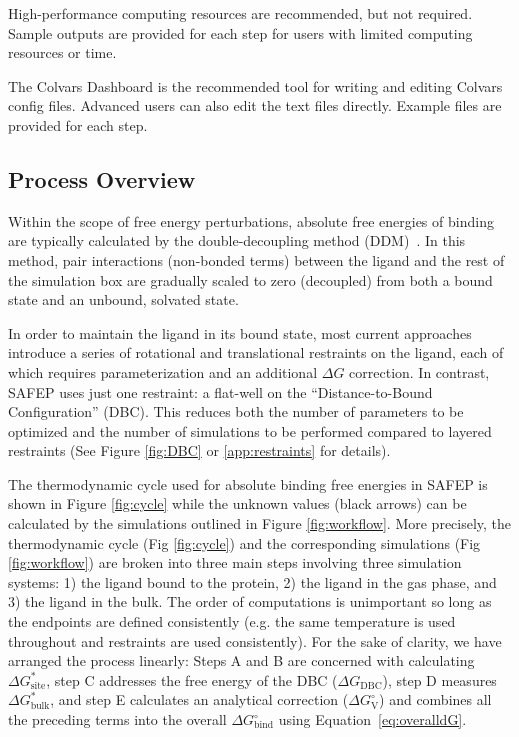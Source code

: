 \documentclass[9pt,tutorial,pubversion]{Styling/livecoms}
\begin{document}
High-performance computing resources are recommended, but not required. Sample outputs are provided for each step for users with limited computing resources or time.

The Colvars Dashboard is the recommended tool for writing and editing Colvars config files. Advanced users can also edit the text files directly. Example files are provided for each step.

\subsection{Process Overview} \label{sec:processOverview}

Within the scope of free energy perturbations, absolute free energies of binding are typically calculated by the double-decoupling method (DDM)~\cite{Gilson1997, Hamelberg2004, Woo2005}. 
In this method, pair interactions (non-bonded terms) between the ligand and the rest of the simulation box are gradually scaled to zero (decoupled) from both a bound state and an unbound, solvated state.

In order to maintain the ligand in its bound state, most current approaches introduce a series of rotational and translational restraints on the ligand, each of which requires parameterization and an additional $\Delta G$ correction.
In contrast, SAFEP uses just one restraint: a flat-well on the ``Distance-to-Bound Configuration'' (DBC). This reduces both the number of parameters to be optimized and the number of simulations to be performed compared to layered restraints (See Figure \ref{fig:DBC} or \ref{app:restraints} for details).

The thermodynamic cycle used for absolute binding free energies in SAFEP is shown in Figure \ref{fig:cycle} while the unknown values (black arrows) can be calculated by the simulations outlined in Figure \ref{fig:workflow}.
More precisely, the thermodynamic cycle (Fig \ref{fig:cycle}) and the corresponding simulations (Fig \ref{fig:workflow}) are broken into three main steps involving three simulation systems: 1) the ligand bound to the protein, 2) the ligand in the gas phase, and 3) the ligand in the bulk. 
The order of computations is unimportant so long as the endpoints are defined consistently (e.g. the same temperature is used throughout and restraints are used consistently).
For the sake of clarity, we have arranged the process linearly: Steps A and B are concerned with calculating $\Delta G^*_\mathrm{site}$, step C addresses the free energy of the DBC ($\Delta G_\mathrm{DBC}$), step D measures $\Delta G^*_\mathrm{bulk}$, and step E calculates an analytical correction ($\Delta G^\circ_\mathrm{V}$) and combines all the preceding terms into the overall $\Delta G^\circ_\mathrm{bind}$ using Equation~\ref{eq:overalldG}.
\end{document}
